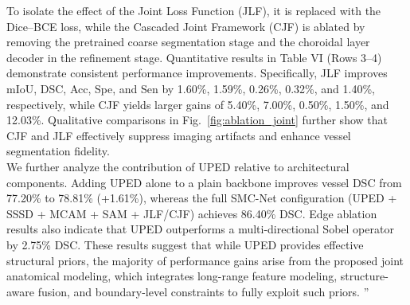 \documentclass[11pt]{article}
\begin{document}
\begin{enumerate}
{{{    To isolate the effect of the Joint Loss Function (JLF), it is replaced with the Dice--BCE loss, while the Cascaded Joint Framework (CJF) is ablated by removing the pretrained coarse segmentation stage and the choroidal layer decoder in the refinement stage. Quantitative results in Table VI (Rows 3--4) demonstrate consistent performance improvements.
    Specifically, JLF improves mIoU, DSC, Acc, Spe, and Sen by 1.60\%, 1.59\%, 0.26\%, 0.32\%, and 1.40\%, respectively, while CJF yields larger gains of 5.40\%, 7.00\%, 0.50\%, 1.50\%, and 12.03\%.
    Qualitative comparisons in Fig.~\ref{fig:ablation_joint} further show that CJF and JLF effectively suppress imaging artifacts and enhance vessel segmentation fidelity.\\
    We further analyze the contribution of UPED relative to architectural components.
    Adding UPED alone to a plain backbone improves vessel DSC from 77.20\% to 78.81\% (+1.61\%), whereas the full SMC-Net configuration (UPED + SSSD + MCAM + SAM + JLF/CJF) achieves 86.40\% DSC.
    Edge ablation results also indicate that UPED outperforms a multi-directional Sobel operator by 2.75\% DSC.
    These results suggest that while UPED provides effective structural priors, the majority of performance gains arise from the proposed joint anatomical modeling, which integrates long-range feature modeling, structure-aware fusion, and boundary-level constraints to fully exploit such priors.
    }''}
    }


\end{enumerate}
\end{document}
